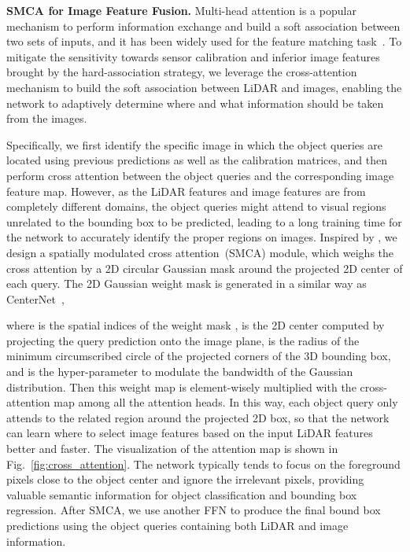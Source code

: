 \noindent\textbf{SMCA for Image Feature Fusion.}
\label{subsubsec:img_fusion}
Multi-head attention is a popular mechanism to perform information exchange and build {a soft association} 
between two sets of inputs, and it has been widely used {for the feature matching task}~\cite{Sarlin2020SuperGlueLF, Sun2021LoFTRDL}. To mitigate the sensitivity towards sensor calibration and inferior image features brought by the hard-association strategy, we leverage the cross-attention mechanism to build {the soft association} between LiDAR and images, enabling the network to adaptively determine where and what information should be taken from the images. 

Specifically, we first {identify} the specific image {in which the object queries are located} 
using previous predictions as well as the calibration matrices, and then perform cross attention between {the} object queries and the corresponding image feature map.
However, as the LiDAR features and image features are from completely different domains, the object queries might attend to visual regions unrelated to the bounding box to be predicted, leading to a long training time for the network to accurately identify the proper regions on images. Inspired by \cite{Gao2021FastCO}, we design a spatially
modulated cross attention~(SMCA) module{,} which weighs the cross attention by a 2D circular Gaussian mask around the projected 2D center of each query. The 2D Gaussian {weight} mask  is generated in a similar way as CenterNet~\cite{Zhou2019ObjectsAP},

where  is the spatial indices of the weight mask ,  is the 2D center computed by projecting the query prediction 
onto the image plane,  is the radius of the minimum circumscribed circle
of the projected corners of the 3D bounding box, and  is the hyper-parameter to modulate the bandwidth of the Gaussian distribution. 
Then this weight map is element-wisely multiplied with the cross-attention map among all the {attention} heads.
In this way, each object query only attends to the related region around the projected 2D box, so that the network can learn where to select image features based on the input LiDAR features better and faster. The visualization of the attention map is shown in Fig.~\ref{fig:cross_attention}. The network typically tends to focus on the foreground pixels close to the object center and ignore the irrelevant pixels, providing valuable semantic information for {object classification and bounding box regression.}
After SMCA, we use another FFN to produce the final bound box predictions using the object queries containing both LiDAR and image information.









